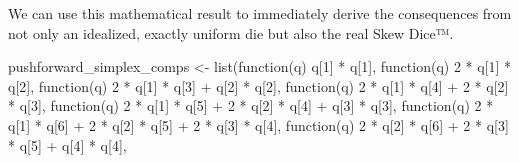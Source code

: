 \documentclass[
  letterpaper,
  DIV=11,
  numbers=noendperiod]{scrartcl}
\newenvironment{Shaded}{\begin{snugshade}}{\end{snugshade}}
\newcommand{\ControlFlowTok}[1]{\textcolor[rgb]{0.00,0.23,0.31}{#1}}
\newcommand{\DecValTok}[1]{\textcolor[rgb]{0.68,0.00,0.00}{#1}}
\newcommand{\FunctionTok}[1]{\textcolor[rgb]{0.28,0.35,0.67}{#1}}
\newcommand{\NormalTok}[1]{\textcolor[rgb]{0.00,0.23,0.31}{#1}}
\newcommand{\OtherTok}[1]{\textcolor[rgb]{0.00,0.23,0.31}{#1}}
\newcommand{\SpecialCharTok}[1]{\textcolor[rgb]{0.37,0.37,0.37}{#1}}
\begin{document}
We can use this mathematical result to immediately derive the
consequences from not only an idealized, exactly uniform die but also
the real Skew Dice™.

\begin{Shaded}
\begin{Highlighting}[]
\NormalTok{pushforward\_simplex\_comps }\OtherTok{\textless{}{-}}
  \FunctionTok{list}\NormalTok{(}\ControlFlowTok{function}\NormalTok{(q)}
\NormalTok{             q[}\DecValTok{1}\NormalTok{] }\SpecialCharTok{*}\NormalTok{ q[}\DecValTok{1}\NormalTok{],}
       \ControlFlowTok{function}\NormalTok{(q)}
         \DecValTok{2} \SpecialCharTok{*}\NormalTok{ q[}\DecValTok{1}\NormalTok{] }\SpecialCharTok{*}\NormalTok{ q[}\DecValTok{2}\NormalTok{],}
       \ControlFlowTok{function}\NormalTok{(q)}
         \DecValTok{2} \SpecialCharTok{*}\NormalTok{ q[}\DecValTok{1}\NormalTok{] }\SpecialCharTok{*}\NormalTok{ q[}\DecValTok{3}\NormalTok{] }\SpecialCharTok{+}\NormalTok{     q[}\DecValTok{2}\NormalTok{] }\SpecialCharTok{*}\NormalTok{ q[}\DecValTok{2}\NormalTok{],}
       \ControlFlowTok{function}\NormalTok{(q)}
         \DecValTok{2} \SpecialCharTok{*}\NormalTok{ q[}\DecValTok{1}\NormalTok{] }\SpecialCharTok{*}\NormalTok{ q[}\DecValTok{4}\NormalTok{] }\SpecialCharTok{+} \DecValTok{2} \SpecialCharTok{*}\NormalTok{ q[}\DecValTok{2}\NormalTok{] }\SpecialCharTok{*}\NormalTok{ q[}\DecValTok{3}\NormalTok{],}
       \ControlFlowTok{function}\NormalTok{(q)}
         \DecValTok{2} \SpecialCharTok{*}\NormalTok{ q[}\DecValTok{1}\NormalTok{] }\SpecialCharTok{*}\NormalTok{ q[}\DecValTok{5}\NormalTok{] }\SpecialCharTok{+} \DecValTok{2} \SpecialCharTok{*}\NormalTok{ q[}\DecValTok{2}\NormalTok{] }\SpecialCharTok{*}\NormalTok{ q[}\DecValTok{4}\NormalTok{] }\SpecialCharTok{+}\NormalTok{     q[}\DecValTok{3}\NormalTok{] }\SpecialCharTok{*}\NormalTok{ q[}\DecValTok{3}\NormalTok{],}
       \ControlFlowTok{function}\NormalTok{(q)}
         \DecValTok{2} \SpecialCharTok{*}\NormalTok{ q[}\DecValTok{1}\NormalTok{] }\SpecialCharTok{*}\NormalTok{ q[}\DecValTok{6}\NormalTok{] }\SpecialCharTok{+} \DecValTok{2} \SpecialCharTok{*}\NormalTok{ q[}\DecValTok{2}\NormalTok{] }\SpecialCharTok{*}\NormalTok{ q[}\DecValTok{5}\NormalTok{] }\SpecialCharTok{+} \DecValTok{2} \SpecialCharTok{*}\NormalTok{ q[}\DecValTok{3}\NormalTok{] }\SpecialCharTok{*}\NormalTok{ q[}\DecValTok{4}\NormalTok{],}
       \ControlFlowTok{function}\NormalTok{(q)}
         \DecValTok{2} \SpecialCharTok{*}\NormalTok{ q[}\DecValTok{2}\NormalTok{] }\SpecialCharTok{*}\NormalTok{ q[}\DecValTok{6}\NormalTok{] }\SpecialCharTok{+} \DecValTok{2} \SpecialCharTok{*}\NormalTok{ q[}\DecValTok{3}\NormalTok{] }\SpecialCharTok{*}\NormalTok{ q[}\DecValTok{5}\NormalTok{] }\SpecialCharTok{+}\NormalTok{     q[}\DecValTok{4}\NormalTok{] }\SpecialCharTok{*}\NormalTok{ q[}\DecValTok{4}\NormalTok{],}

\end{Highlighting}
\end{Shaded}
\end{document}
